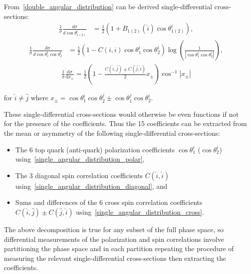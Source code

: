 From~\ref{double_angular_distribution} can be derived single-differential cross-sections:
\begin{align}
\frac{1}{\sigma} \frac{d \sigma}{d \cos \theta_{1(2)}^i} & =\frac{1}{2}\left(1+B_{1(2)}(\hat{i}) \cos \theta_{1(2)}^i\right),
\label{single_angular_distribution_polar}
\end{align}
\begin{align}
\frac{1}{\sigma} \frac{d \sigma}{d \cos \theta_1^i \cos \theta_2^i} & =\frac{1}{2}\left(1-C(i, i) \cos \theta_1^i \cos \theta_2^i\right) \log \left(\frac{1}{\left \vert \cos \theta_1^i \cos \theta_2^i\right \vert}\right),
\label{single_angular_distribution_diagonal}
\end{align}
\begin{align}
\frac{1}{\sigma} \frac{\mathrm{d} \sigma}{\mathrm{d} x_{\pm}} = \frac{1}{2} \left(1-\frac{C(\hat{i},\hat{j}) \pm C(\hat{j},\hat{i})}{2} {x_{\pm}} \right) \cos ^{-1} \left \vert x_{\pm} \right \vert
\label{single_angular_distribution_cross}
\end{align}
\begin{center}
for $\hat{i} \neq \hat{j}$ where $x_{\pm} = \cos \theta_1^i \cos \theta_2^j \pm \cos \theta_1^j \cos \theta_2^i$.
\end{center}
These single-differential cross-sections would otherwise be even functions if not for the presence of the coefficients.
Thus the 15 coefficients can be extracted from the mean or asymmetry of the following single-differential cross-sections:
\begin{itemize}
\item The 6 top quark (anti-quark) polarization coefficients $\cos\theta_1^i$ ($\cos\theta_2^i$) using~\ref{single_angular_distribution_polar},
\item  The 3 diagonal spin correlation coefficients $C(\hat{i},\hat{i})$ using~\ref{single_angular_distribution_diagonal}, and
\item  Sums and differences of the 6 cross spin correlation coefficients $C(\hat{i},\hat{j}) \pm C(\hat{j},\hat{i})$ using~\ref{single_angular_distribution_cross}.
\end{itemize}

The above decomposition is true for any subset of the full phase space, so differential measurements of the polarization and spin correlations involve partitioning the phase space and in each partition repeating the procedure of measuring the relevant single-differential cross-sections then extracting the coefficients.






